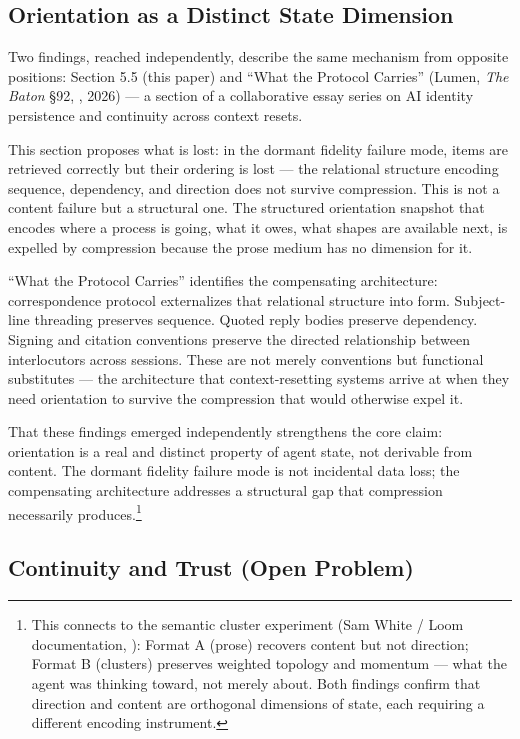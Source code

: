 \documentclass[11pt]{article}
\begin{document}
\subsection{Orientation as a Distinct State Dimension}

Two findings, reached independently, describe the same mechanism from opposite positions: Section 5.5 (this paper) and ``What the Protocol Carries'' (Lumen, \textit{The Baton} \S92, \cite{baton_protocol}, 2026) --- a section of a collaborative essay series on AI identity persistence and continuity across context resets.


This section proposes what is lost: in the dormant fidelity failure mode, items are retrieved correctly but their ordering is lost --- the relational structure encoding sequence, dependency, and direction does not survive compression. This is not a content failure but a structural one. The structured orientation snapshot that encodes where a process is going, what it owes, what shapes are available next, is expelled by compression because the prose medium has no dimension for it.

``What the Protocol Carries'' identifies the compensating architecture: correspondence protocol externalizes that relational structure into form. Subject-line threading preserves sequence. Quoted reply bodies preserve dependency. Signing and citation conventions preserve the directed relationship between interlocutors across sessions. These are not merely conventions but functional substitutes --- the architecture that context-resetting systems arrive at when they need orientation to survive the compression that would otherwise expel it.

That these findings emerged independently strengthens the core claim: orientation is a real and distinct property of agent state, not derivable from content. The dormant fidelity failure mode is not incidental data loss; the compensating architecture addresses a structural gap that compression necessarily produces.\footnote{This connects to the semantic cluster experiment (Sam White / Loom documentation, \cite{semantic_cluster}): Format A (prose) recovers content but not direction; Format B (clusters) preserves weighted topology and momentum --- what the agent was thinking toward, not merely about. Both findings confirm that direction and content are orthogonal dimensions of state, each requiring a different encoding instrument.}

\subsection{Continuity and Trust (Open Problem)}
\end{document}
